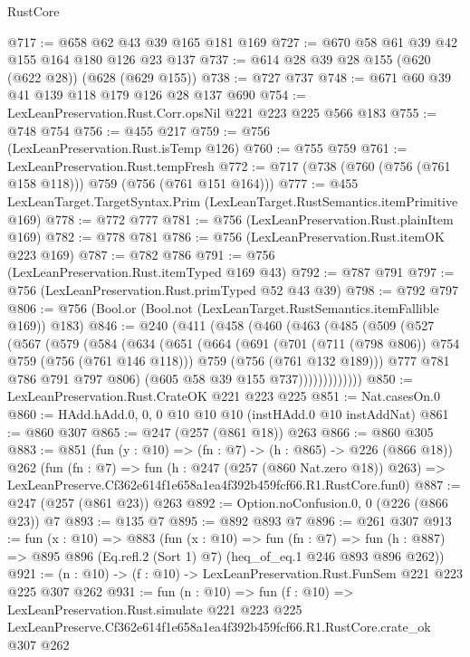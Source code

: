 \begin{lexlean}{RustCore}
\begin{coremodule}
@717 := @658 @62 @43 @39 @165 @181 @169
@727 := @670 @58 @61 @39 @42 @155 @164 @180 @126 @23 @137
@737 := @614 @28 @39 @28 @155 (@620 (@622 @28)) (@628 (@629 @155))
@738 := @727 @737
@748 := @671 @60 @39 @41 @139 @118 @179 @126 @28 @137 @690
@754 := LexLeanPreservation.Rust.Corr.opsNil @221 @223 @225 @566 @183
@755 := @748 @754
@756 := @455 @217
@759 := @756 (LexLeanPreservation.Rust.isTemp @126)
@760 := @755 @759
@761 := LexLeanPreservation.Rust.tempFresh
@772 := @717 (@738 (@760 (@756 (@761 @158 @118))) @759 (@756 (@761 @151 @164)))
@777 := @455 LexLeanTarget.TargetSyntax.Prim (LexLeanTarget.RustSemantics.itemPrimitive @169)
@778 := @772 @777
@781 := @756 (LexLeanPreservation.Rust.plainItem @169)
@782 := @778 @781
@786 := @756 (LexLeanPreservation.Rust.itemOK @223 @169)
@787 := @782 @786
@791 := @756 (LexLeanPreservation.Rust.itemTyped @169 @43)
@792 := @787 @791
@797 := @756 (LexLeanPreservation.Rust.primTyped @52 @43 @39)
@798 := @792 @797
@806 := @756 (Bool.or (Bool.not (LexLeanTarget.RustSemantics.itemFallible @169)) @183)
@846 := @240
    (@411
      (@458
        (@460
          (@463
            (@485
              (@509
                (@527
                  (@567
                    (@579
                      (@584
                        (@634
                          (@651
                            (@664
                              (@691
                                (@701 (@711 (@798 @806)) @754 @759 (@756 (@761 @146 @118)))
                                @759
                                (@756 (@761 @132 @189)))
                              @777
                              @781
                              @786
                              @791
                              @797
                              @806)
                            (@605 @58 @39 @155 @737)))))))))))))
@850 := LexLeanPreservation.Rust.CrateOK @221 @223 @225
@851 := Nat.casesOn.{0}
@860 := HAdd.hAdd.{0, 0, 0} @10 @10 @10 (instHAdd.{0} @10 instAddNat)
@861 := @860 @307
@865 := @247 (@257 (@861 @18)) @263
@866 := @860 @305
@883 := @851
    (fun (y : @10) => (fn : @7) -> (h : @865) -> @226 (@866 @18))
    @262
    (fun (fn : @7) =>
    fun (h : @247 (@257 (@860 Nat.zero @18)) @263) =>
    LexLeanPreserve.Cf362e614f1e658a1ea4f392b459fcf66.R1.RustCore.fun0)
@887 := @247 (@257 (@861 @23)) @263
@892 := Option.noConfusion.{0, 0} (@226 (@866 @23)) @7
@893 := @135 @7
@895 := @892 @893 @7
@896 := @261 @307
@913 := fun (x : @10) =>
  @883
    (fun (x : @10) =>
    fun (fn : @7) =>
    fun (h : @887) => @895 @896 (Eq.refl.{2} (Sort 1) @7) (heq_of_eq.{1} @246 @893 @896 @262))
@921 := (n : @10) -> (f : @10) -> LexLeanPreservation.Rust.FunSem @221 @223 @225 @307 @262
@931 := fun (n : @10) =>
  fun (f : @10) =>
  LexLeanPreservation.Rust.simulate
    @221
    @223
    @225
    LexLeanPreserve.Cf362e614f1e658a1ea4f392b459fcf66.R1.RustCore.crate_ok
    @307
    @262
\end{coremodule}
\end{lexlean}
